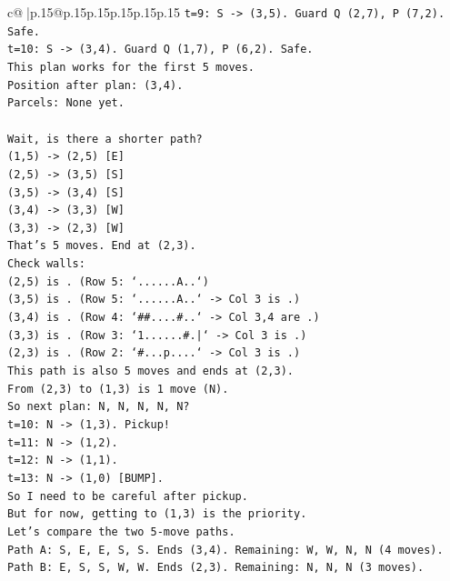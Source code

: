 \documentclass{article}
\begin{document}
{\begin{supertabular}{c@{$\;$}|p{.15\linewidth}@{}p{.15\linewidth}p{.15\linewidth}p{.15\linewidth}p{.15\linewidth}p{.15\linewidth}}
{{{\texttt{t=9: S {-}> (3,5). Guard Q (2,7), P (7,2). Safe.} \\
\texttt{t=10: S {-}> (3,4). Guard Q (1,7), P (6,2). Safe.} \\
\texttt{This plan works for the first 5 moves.} \\
\texttt{Position after plan: (3,4).} \\
\texttt{Parcels: None yet.} \\
\\ 
\texttt{Wait, is there a shorter path?} \\
\texttt{(1,5) {-}> (2,5) {[}E{]}} \\
\texttt{(2,5) {-}> (3,5) {[}S{]}} \\
\texttt{(3,5) {-}> (3,4) {[}S{]}} \\
\texttt{(3,4) {-}> (3,3) {[}W{]}} \\
\texttt{(3,3) {-}> (2,3) {[}W{]}} \\
\texttt{That's 5 moves. End at (2,3).} \\
\texttt{Check walls:} \\
\texttt{(2,5) is . (Row 5: `......A..`)} \\
\texttt{(3,5) is . (Row 5: `......A..` {-}> Col 3 is .)} \\
\texttt{(3,4) is . (Row 4: `\#\#....\#..` {-}> Col 3,4 are .)} \\
\texttt{(3,3) is . (Row 3: `1......\#.|` {-}> Col 3 is .)} \\
\texttt{(2,3) is . (Row 2: `\#...p....` {-}> Col 3 is .)} \\
\texttt{This path is also 5 moves and ends at (2,3).} \\
\texttt{From (2,3) to (1,3) is 1 move (N).} \\
\texttt{So next plan: N, N, N, N, N?} \\
\texttt{t=10: N {-}> (1,3). Pickup!} \\
\texttt{t=11: N {-}> (1,2).} \\
\texttt{t=12: N {-}> (1,1).} \\
\texttt{t=13: N {-}> (1,0) {[}BUMP{]}.} \\
\texttt{So I need to be careful after pickup.} \\
\texttt{But for now, getting to (1,3) is the priority.} \\
\texttt{Let's compare the two 5{-}move paths.} \\
\texttt{Path A: S, E, E, S, S. Ends (3,4). Remaining: W, W, N, N (4 moves).} \\
\texttt{Path B: E, S, S, W, W. Ends (2,3). Remaining: N, N, N (3 moves).} \\
}}}
\end{supertabular}}
\end{document}
